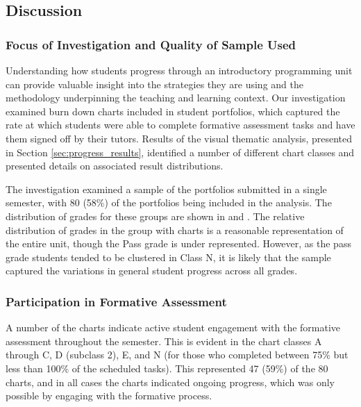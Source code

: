 



\subsection{Discussion} %
\label{sec:progress_discussion}

\subsubsection{Focus of Investigation and Quality of Sample Used} %
\label{sub:focus_of_investigation_and_quality_of_sample_used}

Understanding how students progress through an introductory programming unit can provide valuable insight into the strategies they are using and the methodology underpinning the teaching and learning context. Our investigation examined burn down charts included in student portfolios, which captured the rate at which students were able to complete formative assessment tasks and have them signed off by their tutors.  Results of the visual thematic analysis, presented in Section \ref{sec:progress_results}, identified a number of different chart classes and presented details on associated result distributions.

The investigation examined a sample of the portfolios submitted in a single semester, with 80 (58\%) of the portfolios being included in the analysis. The distribution of grades for these groups are shown in  and . The relative distribution of grades in the group with charts is a reasonable representation of the entire unit, though the Pass grade is under represented. However, as the pass grade students tended to be clustered in Class N, it is likely that the sample captured the variations in general student progress across all grades.


\subsubsection{Participation in Formative Assessment} %
\label{sub:participation_in_formative_assessment}

A number of the charts indicate active student engagement with the formative assessment throughout the semester. This is evident in the chart classes A through C, D (subclass 2), E, and N (for those who completed between 75\% but less than 100\% of the scheduled tasks). This represented 47 (59\%) of the 80 charts, and in all cases the charts indicated ongoing progress, which was only possible by engaging with the formative process. 

